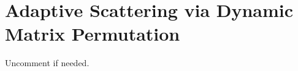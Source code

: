 \documentclass[conference]{IEEEtran}
\begin{document}
\newpage

\section{ Adaptive Scattering via Dynamic Matrix Permutation}
\label{sec:adaptive_scattering}

Uncomment if needed.

\end{document}

